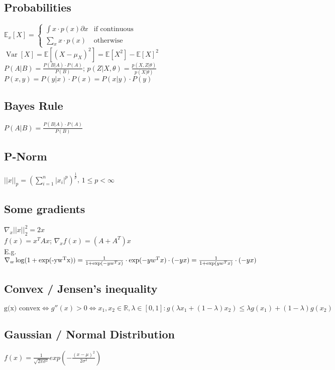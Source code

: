 \documentclass[11pt]{article}
\begin{document}
\begin{multicols*}{3}
	
	\subsection*{Probabilities}
	$\mathbb{E}_x[X] = \begin{cases}
		\int x \cdot p(x) \partial x  & \text{if continuous}\\
		\sum_x x \cdot p(x) & \text{otherwise}
	\end{cases}$\\
	$\operatorname{Var}[X] = \mathbb{E}[(X-\mu_X)^2] = \mathbb{E}[X^2] - \mathbb{E}[X]^2$\\
	$P(A|B) = \frac{P(B|A) \cdot P(A)}{P(B)}$; $p(Z|X,\theta) = \frac{p(X,Z|\theta)}{p(X|\theta)}$\\
	$P(x,y) = P(y|x) \cdot  P(x) = P(x|y) \cdot P(y)$
	
	\subsection*{{Bayes Rule}}
	$P(A|B) = \frac{P(B|A) \cdot P(A)}{P(B)}$
	
	\subsection*{P-Norm}
	$||x||_p = (\sum_{i=1}^n|x_i|^p)^{\frac{1}{p}}$, $1 \leq p < \infty$
	
	\subsection*{Some gradients}
	$\nabla_x ||x||_2^2 = 2 x$\\
	$f(x) = x^T A x$; $\nabla_x f(x) = (A + A^T) x$\\
	E.g. $\nabla_w \operatorname{log}(1+\operatorname{exp(-y w^T x)}) = \\
	\frac{1}{1+\operatorname{exp}(-y w^T x)} \cdot \operatorname{exp}(-y w^T x) \cdot (-y x) = \\
	\frac{1}{1 + \operatorname{exp}(y w^T x)} \cdot(-yx)$\\
	
	
	\subsection*{Convex / Jensen's inequality}
	$\text{g(x) convex} \Leftrightarrow g''(x) > 0 \Leftrightarrow x_1,x_2 \in \mathbb{R}, \lambda \in [0,1]: 
	g(\lambda x_1 + (1-\lambda) x_2) \leq \lambda g(x_1) + (1-\lambda) g(x_2)$
	
	\subsection*{Gaussian / Normal Distribution}
	$f(x) = \frac{1}{\sqrt{2\pi\sigma^2}} exp(-\frac{(x-\mu)^2}{2\sigma^2})$
	

\end{multicols*}
\end{document}
